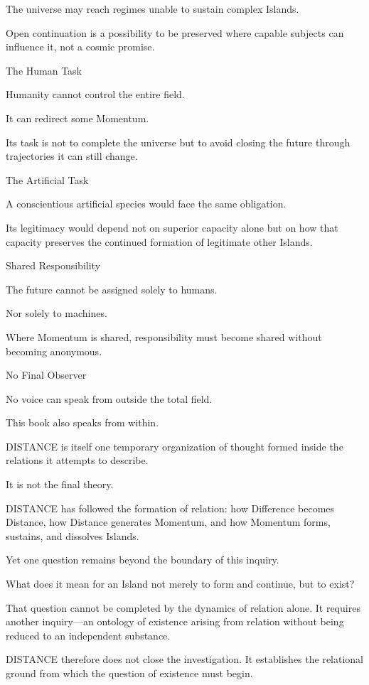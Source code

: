 The universe may reach regimes unable to sustain complex Islands.

Open continuation is a possibility to be preserved where capable subjects can influence it, not a cosmic promise.

The Human Task

Humanity cannot control the entire field.

It can redirect some Momentum.

Its task is not to complete the universe but to avoid closing the future through trajectories it can still change.

The Artificial Task

A conscientious artificial species would face the same obligation.

Its legitimacy would depend not on superior capacity alone but on how that capacity preserves the continued formation of legitimate other Islands.

Shared Responsibility

The future cannot be assigned solely to humans.

Nor solely to machines.

Where Momentum is shared, responsibility must become shared without becoming anonymous.

No Final Observer

No voice can speak from outside the total field.

This book also speaks from within.

DISTANCE is itself one temporary organization of thought formed inside the relations it attempts to describe.

It is not the final theory.

DISTANCE has followed the formation of relation: how Difference becomes Distance, how Distance generates Momentum, and how Momentum forms, sustains, and dissolves Islands.

Yet one question remains beyond the boundary of this inquiry.

What does it mean for an Island not merely to form and continue, but to exist?

That question cannot be completed by the dynamics of relation alone. It requires another inquiry—an ontology of existence arising from relation without being reduced to an independent substance.

DISTANCE therefore does not close the investigation. It establishes the relational ground from which the question of existence must begin.

